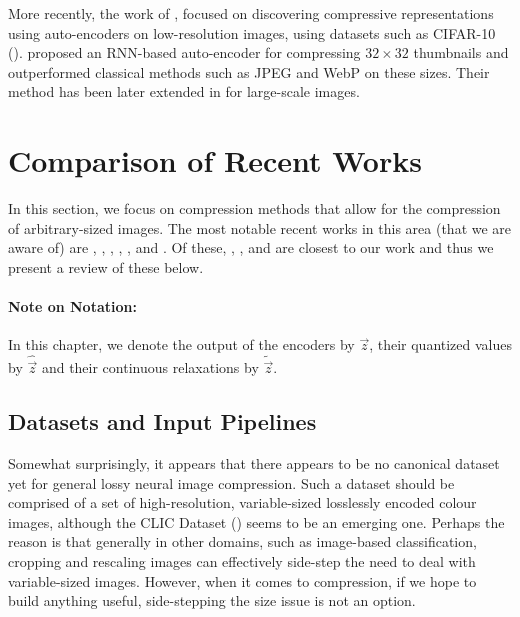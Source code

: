 \par 
More recently, the work of \cite{denton2015deep}, \cite{gregor2015draw} focused
on discovering compressive representations using auto-encoders on low-resolution
images, using datasets such as CIFAR-10 (\cite{krizhevsky2009learning}).
\cite{toderici2015variable} proposed an RNN-based auto-encoder for compressing $32
\times 32$ thumbnails and outperformed classical methods such as JPEG and WebP
on these sizes. Their method has been later extended in \cite{toderici2017full}
for large-scale images. 

\section{Comparison of Recent Works}
\label{sec:lit_comparison}
\par
In this section, we focus on compression methods that allow for the compression
of arbitrary-sized images. The most notable recent works in this area (that we
are aware of) are \cite{balle2016end}, \cite{toderici2017full}, \cite{theis2017lossy},
\cite{rippel2017real}, \cite{balle2018variational}, \cite{johnston2018cvpr} and
\cite{mentzer2018cvpr}. Of these, \cite{balle2016end}, \cite{theis2017lossy},
\cite{rippel2017real} and \cite{balle2018variational} are closest to our work and
thus we present a review of these below.

\paragraph{Note on Notation:} In this chapter, we denote the output of the
encoders by $\vec{z}$, their quantized values by $\hat{\vec{z}}$ and their
continuous relaxations by $\tilde{\vec{z}}$.

\subsection{Datasets and Input Pipelines}
\label{sec:related_works_datasets}
\par
Somewhat surprisingly, it appears that there appears to be no canonical dataset
yet for general lossy neural image compression. Such a dataset should be
comprised of a set of high-resolution, variable-sized losslessly
encoded colour images, although the CLIC Dataset (\cite{clic2018}) seems to be
an emerging one. Perhaps the reason is that generally in other domains, such as
image-based classification, cropping and rescaling images can effectively
side-step the need to deal with variable-sized images. However, when it comes
to compression, if we hope to build anything useful, side-stepping the size
issue is not an option.

